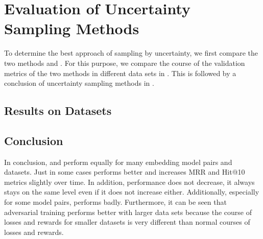 \section{Evaluation of Uncertainty Sampling Methods}
\label{ch:evaluation:sec:evaluation_methods}
%
To determine the best approach of sampling by uncertainty, we first compare the two methods \usmax and \ussoftmax.
For this purpose, we compare the course of the validation metrics of the two methods in different data sets in .
This is followed by a conclusion of uncertainty sampling methods in  .
%
\subsection{Results on Datasets} \label{subsec:methods_results}




%
\subsection{Conclusion} 
\label{subsec:methods_conclusion}
%
In conclusion, \usmax and \ussoftmax perform equally for many embedding model pairs and datasets.
Just in some cases \ussoftmax performs better and increases MRR and Hit@10 metrics slightly over time.
In addition, performance does not decrease, it always stays on the same level even if it does not increase either.
Additionally, especially for some model pairs, \usmax performs badly.
Furthermore, it can be seen that adversarial training performs better with larger data sets because the course of losses and rewards for smaller datasets is very different than normal courses of losses and rewards.